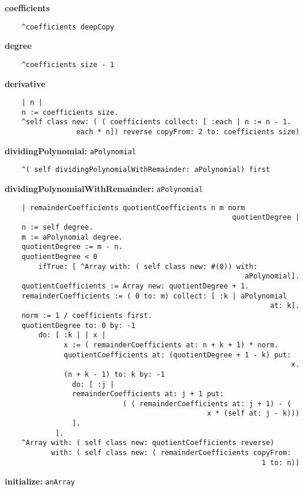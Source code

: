 {\bf coefficients}
\begin{verbatim}
    ^coefficients deepCopy

\end{verbatim}
{\bf degree}
\begin{verbatim}
    ^coefficients size - 1

\end{verbatim}
{\bf derivative}
\begin{verbatim}
    | n |
    n := coefficients size.
    ^self class new: ( ( coefficients collect: [ :each | n := n - 1. 
                 each * n]) reverse copyFrom: 2 to: coefficients size)

\end{verbatim}
{\bf dividingPolynomial:} {\tt aPolynomial}
\begin{verbatim}
    ^( self dividingPolynomialWithRemainder: aPolynomial) first

\end{verbatim}
{\bf dividingPolynomialWithRemainder:} {\tt aPolynomial}
\begin{verbatim}
    | remainderCoefficients quotientCoefficients n m norm 
                                                      quotientDegree |
    n := self degree.
    m := aPolynomial degree.
    quotientDegree := m - n.
    quotientDegree < 0
        ifTrue: [ ^Array with: ( self class new: #(0)) with: 
                                                         aPolynomial].
    quotientCoefficients := Array new: quotientDegree + 1.
    remainderCoefficients := ( 0 to: m) collect: [ :k | aPolynomial 
                                                               at: k].
    norm := 1 / coefficients first.
    quotientDegree to: 0 by: -1
        do: [ :k | | x |
              x := ( remainderCoefficients at: n + k + 1) * norm.
              quotientCoefficients at: (quotientDegree + 1 - k) put: 
                                                                    x.
              (n + k - 1) to: k by: -1
                do: [ :j | 
                remainderCoefficients at: j + 1 put: 
                            ( ( remainderCoefficients at: j + 1) - ( 
                                                x * (self at: j - k)))
                ].
            ].
    ^Array with: ( self class new: quotientCoefficients reverse)
           with: ( self class new: ( remainderCoefficients copyFrom: 
                                                             1 to: n))

\end{verbatim}
{\bf initialize:} {\tt anArray}
